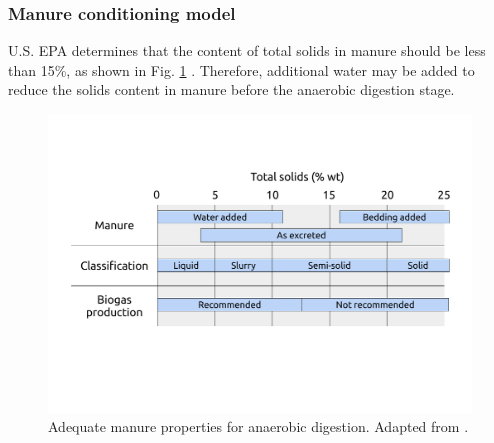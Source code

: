 \begin{refsection}[referencesCh4]
\subsubsection{Manure conditioning model}
U.S. EPA determines that the content of total solids in manure should be less than 15\%, as shown in Fig. \ref{fig:TS_max_AppC} \citep{AgSTARHandbook}. Therefore, additional water may be added to reduce the solids content in manure before the anaerobic digestion stage.
\begin{figure}[h]
	\centering
	\includegraphics[width=0.85\linewidth, trim=1cm 4cm 1cm 2.5cm, clip]{gfx/AppendixC/water_manure_properties} 
	\caption{Adequate manure properties for anaerobic digestion. Adapted from \protect\citet{AgSTARHandbook}.}
	\label{fig:TS_max_AppC}
\end{figure}


\end{refsection}
